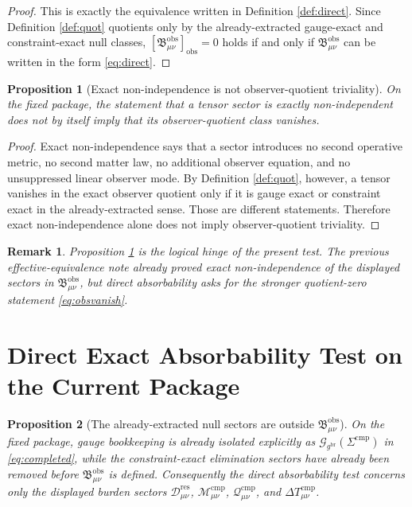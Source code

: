\documentclass[11pt]{article}
\newcommand{\ObserverMetric}{g^{\mathrm{br}}}
\newcommand{\CompShift}{\Sigma^{\mathrm{cmp}}}
\newcommand{\ResidualDec}{\mathcal D_{\mu\nu}^{\mathrm{res}}}
\newcommand{\GaugeBook}{\mathcal G_{\ObserverMetric}}
\newcommand{\CompMix}{\mathcal M_{\mu\nu}^{\mathrm{cmp}}}
\newcommand{\CompQuad}{\mathcal Q_{\mu\nu}^{\mathrm{cmp}}}
\newcommand{\DeltaTComp}{\Delta T_{\mu\nu}^{\mathrm{cmp}}}
\newcommand{\ObsBurden}{\mathfrak B_{\mu\nu}^{\mathrm{obs}}}
\newcommand{\ObserverClass}[1]{\left[#1\right]_{\mathrm{obs}}}
\newtheorem{proposition}{Proposition}
\newtheorem{remark}{Remark}
\begin{document}
\begin{proof}
This is exactly the equivalence written in Definition \ref{def:direct}. Since Definition \ref{def:quot} quotients only by the already-extracted gauge-exact and constraint-exact null classes, \(\ObserverClass{\ObsBurden}=0\) holds if and only if \(\ObsBurden\) can be written in the form \eqref{eq:direct}.
\end{proof}

\begin{proposition}[Exact non-independence is not observer-quotient triviality]
\label{prop:notsame}
On the fixed package, the statement that a tensor sector is exactly non-independent does not by itself imply that its observer-quotient class vanishes.
\end{proposition}

\begin{proof}
Exact non-independence says that a sector introduces no second operative metric, no second matter law, no additional observer equation, and no unsuppressed linear observer mode. By Definition \ref{def:quot}, however, a tensor vanishes in the exact observer quotient only if it is gauge exact or constraint exact in the already-extracted sense. Those are different statements. Therefore exact non-independence alone does not imply observer-quotient triviality.
\end{proof}

\begin{remark}
Proposition \ref{prop:notsame} is the logical hinge of the present test. The previous effective-equivalence note already proved exact non-independence of the displayed sectors in \(\ObsBurden\), but direct absorbability asks for the stronger quotient-zero statement \eqref{eq:obsvanish}.
\end{remark}

\section{Direct Exact Absorbability Test on the Current Package}

\begin{proposition}[The already-extracted null sectors are outside \texorpdfstring{\(\ObsBurden\)}{ObsBurden}]
\label{prop:outside}
On the fixed package, gauge bookkeeping is already isolated explicitly as \(\GaugeBook(\CompShift)\) in \eqref{eq:completed}, while the constraint-exact elimination sectors have already been removed before \(\ObsBurden\) is defined. Consequently the direct absorbability test concerns only the displayed burden sectors \(\ResidualDec\), \(\CompMix\), \(\CompQuad\), and \(\DeltaTComp\).
\end{proposition}
\end{document}
